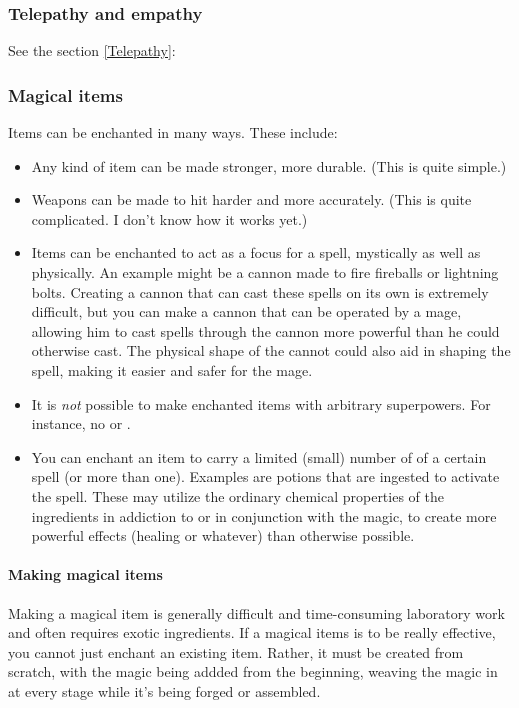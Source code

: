 \subsubsection{Telepathy and empathy}
See the section \ref{Telepathy}: 





\subsubsection{Magical items}
Items can be enchanted in many ways. These include:

\begin{itemize}
  \item 
    Any kind of item can be made stronger, more durable. (This is quite simple.)
  \item 
    Weapons can be made to hit harder and more accurately. (This is quite complicated. I don't know how it works yet.)
  \item 
    Items can be enchanted to act as a focus for a spell, mystically as well as physically. An example might be a cannon made to fire fireballs or lightning bolts. Creating a cannon that can cast these spells on its own is extremely difficult, but you can make a cannon that can be operated by a mage, allowing him to cast spells through the cannon more powerful than he could otherwise cast. The physical shape of the cannot could also aid in shaping the spell, making it easier and safer for the mage. 
  \item 
    It is \emph{not} possible to make enchanted items with arbitrary superpowers. For instance, no  or .
  \item 
    You can enchant an item to carry a limited (small) number of  of a certain spell (or more than one). Examples are potions that are ingested to activate the spell. These may utilize the ordinary chemical properties of the ingredients in addiction to or in conjunction with the magic, to create more powerful effects (healing or whatever) than otherwise possible. 
\end{itemize}

\paragraph{Making magical items}
Making a magical item is generally difficult and time-consuming laboratory work and often requires exotic ingredients. If a magical items is to be really effective, you cannot just enchant an existing item. Rather, it must be created from scratch, with the magic being addded from the beginning, weaving the magic in at every stage while it's being forged or assembled. 

